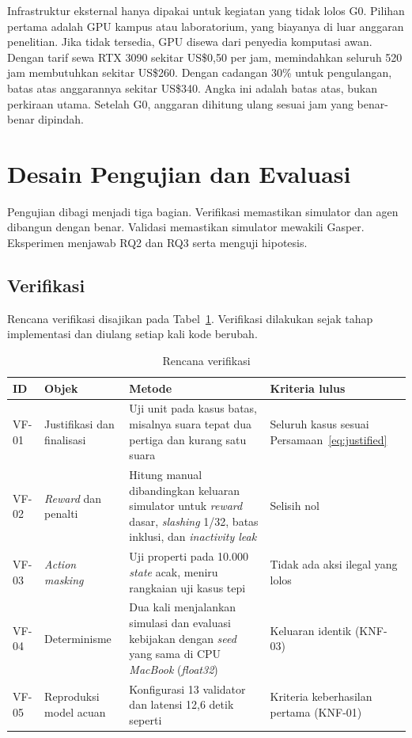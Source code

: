 Infrastruktur eksternal hanya dipakai untuk kegiatan yang tidak lolos G0. Pilihan pertama adalah GPU kampus atau laboratorium, yang biayanya di luar anggaran penelitian. Jika tidak tersedia, GPU disewa dari penyedia komputasi awan. Dengan tarif sewa RTX 3090 sekitar US\$0,50 per jam, memindahkan seluruh 520 jam membutuhkan sekitar US\$260. Dengan cadangan 30\% untuk pengulangan, batas atas anggarannya sekitar US\$340. Angka ini adalah batas atas, bukan perkiraan utama. Setelah G0, anggaran dihitung ulang sesuai jam yang benar-benar dipindah.

\section{Desain Pengujian dan Evaluasi}
\label{sec:desain_pengujian}
Pengujian dibagi menjadi tiga bagian. Verifikasi memastikan simulator dan agen dibangun dengan benar. Validasi memastikan simulator mewakili Gasper. Eksperimen menjawab RQ2 dan RQ3 serta menguji hipotesis.

\subsection{Verifikasi}
\label{subsec:verifikasi}
Rencana verifikasi disajikan pada Tabel~\ref{tab:verifikasi}. Verifikasi dilakukan sejak tahap implementasi dan diulang setiap kali kode berubah.

\begin{table}[htbp]
\centering
\caption{Rencana verifikasi}
\label{tab:verifikasi}
\small
\begin{tabular}{|p{1.0cm}|p{3.1cm}|p{4.6cm}|p{3.5cm}|}
\hline
\textbf{ID} & \textbf{Objek} & \textbf{Metode} & \textbf{Kriteria lulus} \\
\hline
VF-01 & Justifikasi dan finalisasi & Uji unit pada kasus batas, misalnya suara tepat dua pertiga dan kurang satu suara & Seluruh kasus sesuai Persamaan~\eqref{eq:justified} \\
\hline
VF-02 & \textit{Reward} dan penalti & Hitung manual dibandingkan keluaran simulator untuk \textit{reward} dasar, \textit{slashing} 1/32, batas inklusi, dan \textit{inactivity leak} & Selisih nol \\
\hline
VF-03 & \textit{Action masking} & Uji properti pada 10.000 \textit{state} acak, meniru rangkaian uji kasus tepi \textcite{skowronski2026adaptive} & Tidak ada aksi ilegal yang lolos \\
\hline
VF-04 & Determinisme & Dua kali menjalankan simulasi dan evaluasi kebijakan dengan \textit{seed} yang sama di CPU \textit{MacBook} (\textit{float32}) & Keluaran identik (KNF-03) \\
\hline
VF-05 & Reproduksi model acuan & Konfigurasi 13 validator dan latensi 12,6 detik seperti \textcite{laneve2025stochastic} & Kriteria keberhasilan pertama (KNF-01) \\
\hline
\end{tabular}
\end{table}

